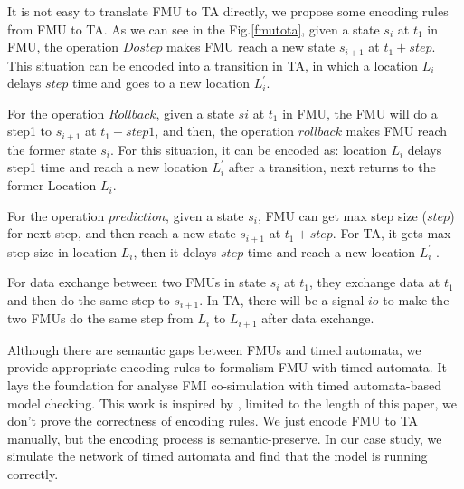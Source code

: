It is not easy to translate FMU to TA directly, we propose some encoding rules from FMU to TA. As we can see in the Fig.\ref{fmutota}, given a state $s_{i}$ at $t_{1}$ in FMU, the operation $Dostep$ makes FMU reach a new state $s_{i+1}$ at $t_{1}+step$. This situation can be encoded into a transition in TA, in which a location $L_{i}$ delays $step$ time and goes to a new location $L_{i}^{\prime}$.

For the operation $Rollback$, given a state $s{i}$ at $t_{1}$ in FMU, the FMU will do a step1 to $s_{i+1}$ at $t_{1}+step1$, and then, the operation $rollback$ makes FMU reach the former state $s_{i}$. For this situation, it can be encoded as: location $L_{i}$ delays step1 time and reach a new location $L_{i}^{\prime}$ after a transition, next returns to the former Location $L_{i}$. 

For the operation $prediction$, given a state $s_{i}$, FMU can get max step size ($step$) for next step, and then reach a new state $s_{i+1}$ at $t_{1}+step$. For TA, it gets max step size in location $L_{i}$, then it delays $step$ time and reach a new location $L_{i}^{\prime}$ .

For data exchange between two FMUs in state $s_{i}$ at $t_{1}$, they exchange data at $t_{1}$ and then do the same step to $s_{i+1}$. In TA, there will be a signal $io$ to make the two FMUs do the same step from $L_{i}$ to $L_{i+1}$ after data exchange.

Although there are semantic gaps between FMUs and timed automata, we provide appropriate encoding rules to formalism FMU with timed automata. It lays the foundation for analyse FMI co-simulation with timed automata-based model checking. This work is inspired by \cite{Tripakis15}, limited to the length of this paper, we don't prove the correctness of encoding rules. We just encode FMU to TA manually, but the encoding process is semantic-preserve. In our case study, we simulate the network of timed automata and find that the model is running correctly.